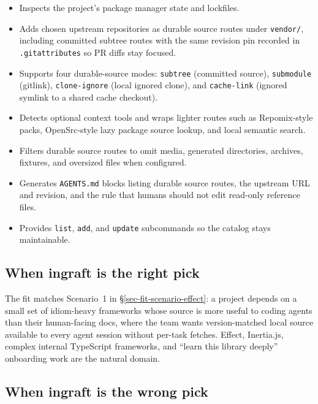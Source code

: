 \documentclass[
  11pt,
  letterpaper,
  numbers=noendperiod,
  parskip=half]{scrartcl}
\providecommand{\tightlist}{%
  \setlength{\itemsep}{0pt}\setlength{\parskip}{0pt}}
\begin{document}
\begin{itemize}
\tightlist
\item
  Inspects the project's package manager state and lockfiles.
\item
  Adds chosen upstream repositories as durable source routes under
  \texttt{vendor/}, including committed subtree routes with the same
  revision pin recorded in \texttt{.gitattributes} so PR diffs stay
  focused.
\item
  Supports four durable-source modes: \texttt{subtree} (committed source),
  \texttt{submodule} (gitlink), \texttt{clone-ignore} (local ignored
  clone), and \texttt{cache-link} (ignored symlink to a shared cache
  checkout).
\item
  Detects optional context tools and wraps lighter routes such as
  Repomix-style packs, OpenSrc-style lazy package source lookup, and
  local semantic search.
\item
  Filters durable source routes to omit media, generated directories,
  archives, fixtures, and oversized files when configured.
\item
  Generates \texttt{AGENTS.md} blocks listing durable source routes, the
  upstream URL and revision, and the rule that humans should not edit
  read-only reference files.
\item
  Provides \texttt{list}, \texttt{add}, and \texttt{update}
  subcommands so the catalog stays maintainable.
\end{itemize}

\subsection*{When ingraft is the right pick}

The fit matches Scenario~1 in \S\ref{sec-fit-scenario-effect}: a
project depends on a small set of idiom-heavy frameworks whose source
is more useful to coding agents than their human-facing docs, where
the team wants version-matched local source available to every agent
session without per-task fetches. Effect, Inertia.js, complex internal
TypeScript frameworks, and ``learn this library deeply'' onboarding
work are the natural domain.

\subsection*{When ingraft is the wrong pick}
\end{document}
